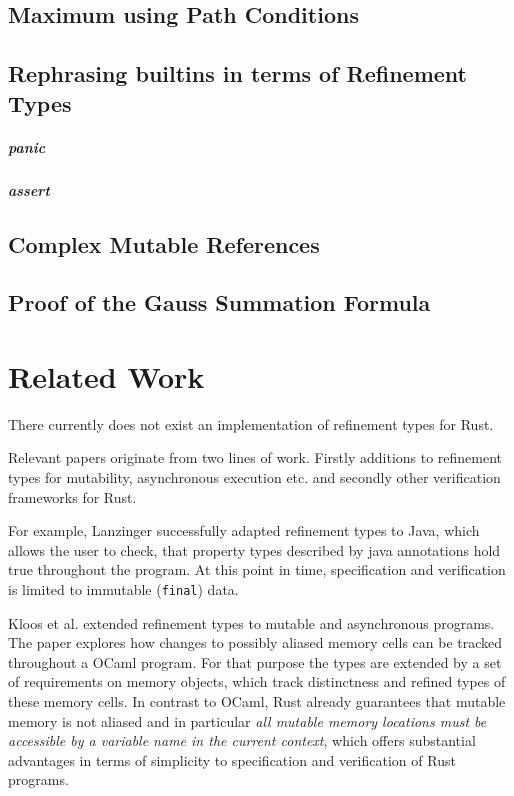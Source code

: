 \documentclass{book}
\newcommand{\code}[1]{\texttt{#1}}
\theoremstyle{definition}
\begin{document}
\section{Maximum using Path Conditions}



\section{Rephrasing builtins in terms of Refinement Types}

\paragraph*{panic}
\paragraph*{assert}

\label{subsec:evaluation-complex-mutable-ref}\section{Complex Mutable References}

\section{Proof of the Gauss Summation Formula}

\chapter{Related Work}

There currently does not exist an implementation of refinement types for Rust.

Relevant papers originate from two lines of work. Firstly additions to refinement types for mutability, asynchronous execution etc. and secondly other verification frameworks for Rust.

For example, Lanzinger \cite{lanzinger_property_2021} successfully adapted refinement types to Java, which allows the user to check, that property types described by java annotations hold true throughout the program. At this point in time, specification and verification is limited to immutable (\code{final}) data.

Kloos et al. \cite{kloos_asynchronous_2015} extended refinement types to mutable and asynchronous programs. The paper explores how changes to possibly aliased memory cells can be tracked throughout a OCaml program. For that purpose the types are extended by a set of requirements on memory objects, which track distinctness and refined types of these memory cells. In contrast to OCaml, Rust already guarantees that mutable memory is not aliased and in particular \textit{all mutable memory locations must be accessible by a variable name in the current context}, which offers substantial advantages in terms of simplicity to specification and verification of Rust programs.
\end{document}
